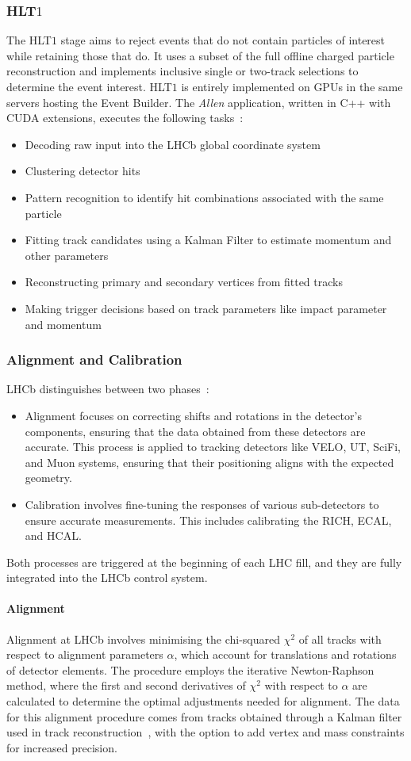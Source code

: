 \subsubsection{HLT$1$}
The HLT$1$ stage aims to reject events that do not contain particles of interest while retaining those that do. It uses a subset of the full offline charged particle reconstruction and implements inclusive single or two-track selections to determine the event interest. HLT$1$ is entirely implemented on GPUs in the same servers hosting the Event Builder. The \textit{Allen} application, written in C++ with CUDA extensions, executes the following tasks~\cite{CERN-LHCC-2020-006}:
\begin{itemize}
\item Decoding raw input into the LHCb global coordinate system
\item Clustering detector hits
\item Pattern recognition to identify hit combinations associated with the same particle
\item Fitting track candidates using a Kalman Filter to estimate momentum and other parameters
\item Reconstructing primary and secondary vertices from fitted tracks
\item Making trigger decisions based on track parameters like impact parameter and momentum
\end{itemize}
\subsubsection{Alignment and Calibration}\label{sec:alignment}
LHCb distinguishes between two phases~\cite{Dziurda:2640712}:
\begin{itemize}
\item Alignment focuses on correcting shifts and rotations in the detector's components, ensuring that the data obtained from these detectors are accurate. This process is applied to tracking detectors like VELO, UT, SciFi, and Muon systems, ensuring that their positioning aligns with the expected geometry.
\item Calibration involves fine-tuning the responses of various sub-detectors to ensure accurate measurements. This includes calibrating the RICH, ECAL, and HCAL.
\end{itemize}
Both processes are triggered at the beginning of each LHC fill, and they are fully integrated into the LHCb control system. 
\paragraph{Alignment}
Alignment at LHCb involves minimising the chi-squared $\chi^2$ of all tracks with respect to alignment parameters $\alpha$, which account for translations and rotations of detector elements. The procedure employs the iterative Newton-Raphson method, where the first and second derivatives of $\chi^2$ with respect to $\alpha$ are calculated to determine the optimal adjustments needed for alignment. The data for this alignment procedure comes from tracks obtained through a Kalman filter used in track reconstruction~\cite{HULSBERGEN2009471}, with the option to add vertex and mass constraints for increased precision.

